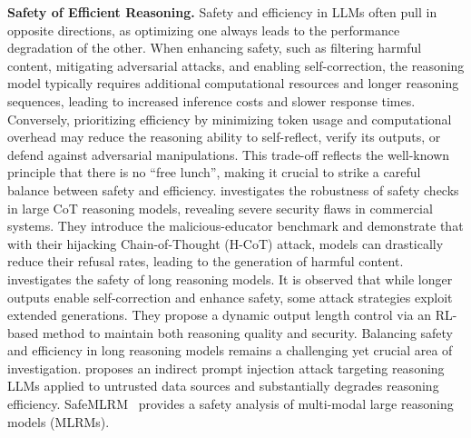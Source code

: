 \textbf{Safety of Efficient Reasoning.} Safety and efficiency in LLMs often pull in opposite directions, as optimizing one always leads to the performance degradation of the other. When enhancing safety, such as filtering harmful content, mitigating adversarial attacks, and enabling self-correction, the reasoning model typically requires additional computational resources and longer reasoning sequences, leading to increased inference costs and slower response times. Conversely, prioritizing efficiency by minimizing token usage and computational overhead may reduce the reasoning ability to self-reflect, verify its outputs, or defend against adversarial manipulations. This trade-off reflects the well-known principle that there is no ``free lunch'', making it crucial to strike a careful balance between safety and efficiency. \cite{kuo2025h} investigates the robustness of safety checks in large CoT reasoning models, revealing severe security flaws in commercial systems. They introduce the malicious-educator benchmark and demonstrate that with their hijacking Chain-of-Thought (H-CoT) attack, models can drastically reduce their refusal rates, leading to the generation of harmful content. \cite{li2025output} investigates the safety of long reasoning models. It is observed that while longer outputs enable self-correction and enhance safety, some attack strategies exploit extended generations. They propose a dynamic output length control via an RL-based method to maintain both reasoning quality and security. Balancing safety and efficiency in long reasoning models remains a challenging yet crucial area of investigation. \cite{kumar2025overthink} proposes an indirect prompt injection attack targeting reasoning LLMs applied to untrusted data sources and substantially degrades reasoning efficiency. SafeMLRM~\cite{fang2025safemlrm} provides a safety analysis of multi-modal large reasoning models (MLRMs).

